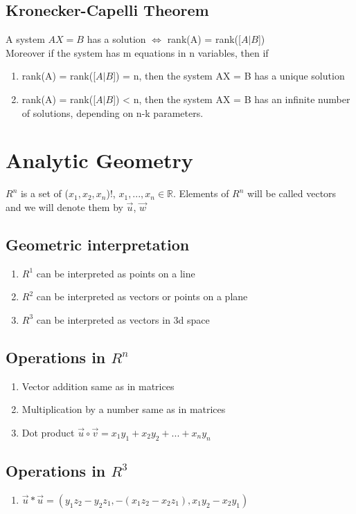 \documentclass{report}
\begin{document}
\section{Kronecker-Capelli Theorem}
A system $AX = B$ has a solution $ \Leftrightarrow $ rank(A) = rank([$A | B$]) \\
Moreover if the system has m equations in n variables, then if 
\begin{enumerate}
	\item rank(A) = rank([$A | B$]) = n, then the system AX = B has a unique solution
	\item rank(A) = rank([$A | B$]) < n, then the system AX = B has an infinite number of solutions, depending on n-k parameters.
\end{enumerate}


\chapter{Analytic Geometry}
$R^n$ is a set of {($x_1, x_2, x_n$)!, $x_1, ..., x_n \in\mathbb{R}$}. Elements of $R^n$ will be called vectors and we will denote them by $\vec{u}$, $\vec{w}$

\section{Geometric interpretation}
\begin{enumerate}
	\item $R^1$ can be interpreted as points on a line
	\item $R^2$ can be interpreted as vectors or points on a plane
	\item $R^3$ can be interpreted as vectors in 3d space
\end{enumerate}

\section{Operations in $R^n$}
\begin{enumerate}
	\item Vector addition same as in matrices
	\item Multiplication by a number same as in matrices
	\item Dot product $\vec{u} \circ \vec{v} = x_1y_1 + x_2y_2 + ... + x_ny_n$
\end{enumerate}

\section{Operations in $R^3$}
\begin{enumerate}
	\item $\vec{u} * \vec{u} = (y_1z_2 - y_2z_1, -(x_1z_2 - x_2z_1), x_1y_2-x_2y_1)$
\end{enumerate}
\end{document}
